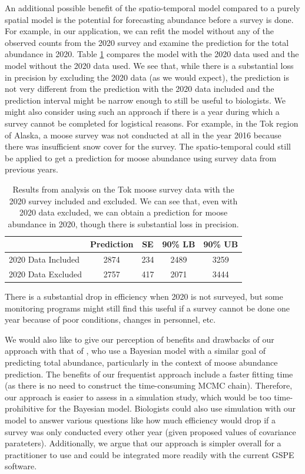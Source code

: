 \documentclass[]{interact}
\theoremstyle{plain}%
\theoremstyle{definition}
\theoremstyle{remark}
\begin{document}
An additional possible benefit of the spatio-temporal model compared to
a purely spatial model is the potential for forecasting abundance before
a survey is done. For example, in our application, we can refit the
model without any of the observed counts from the 2020 survey and
examine the prediction for the total abundance in 2020. Table
\ref{tab:forecast} compares the model with the 2020 data used and the
model without the 2020 data used. We see that, while there is a
substantial loss in precision by excluding the 2020 data (as we would
expect), the prediction is not very different from the prediction with
the 2020 data included and the prediction interval might be narrow
enough to still be useful to biologists. We might also consider using
such an approach if there is a year during which a survey cannot be
completed for logistical reasons. For example, in the Tok region of
Alaska, a moose survey was not conducted at all in the year 2016 because
there was insufficient snow cover for the survey. The spatio-temporal
could still be applied to get a prediction for moose abundance using
survey data from previous years.

\begin{table}[H]

\caption{\label{tab:forecast}Results from analysis on the Tok moose survey data with the 2020 survey included and excluded. We can see that, even with 2020 data excluded, we can obtain a prediction for moose abundance in 2020, though there is substantial loss in precision.}
\centering
\begin{tabular}[t]{lcccc}
\toprule
  & Prediction & SE & 90\% LB & 90\% UB\\
\midrule
2020 Data Included & 2874 & 234 & 2489 & 3259\\
2020 Data Excluded & 2757 & 417 & 2071 & 3444\\
\bottomrule
\end{tabular}
\end{table}

There is a substantial drop in efficiency when 2020 is not surveyed, but
some monitoring programs might still find this useful if a survey cannot
be done one year because of poor conditions, changes in personnel, etc.

We would also like to give our perception of benefits and drawbacks of
our approach with that of \citet{schmidt2022bayesian}, who use a
Bayesian model with a similar goal of predicting total abundance,
particularly in the context of moose abundance prediction. The benefits
of our frequentist approach include a faster fitting time (as there is
no need to construct the time-consuming MCMC chain). Therefore, our
approach is easier to assess in a simulation study, which would be too
time-prohibitive for the Bayesian model. Biologists could also use
simulation with our model to answer various questions like how much
efficiency would drop if a survey was only conducted every other year
(given proposed values of covariance parateters). Additionally, we argue
that our approach is simpler overall for a practitioner to use and could
be integrated more readily with the current GSPE software.
\end{document}

